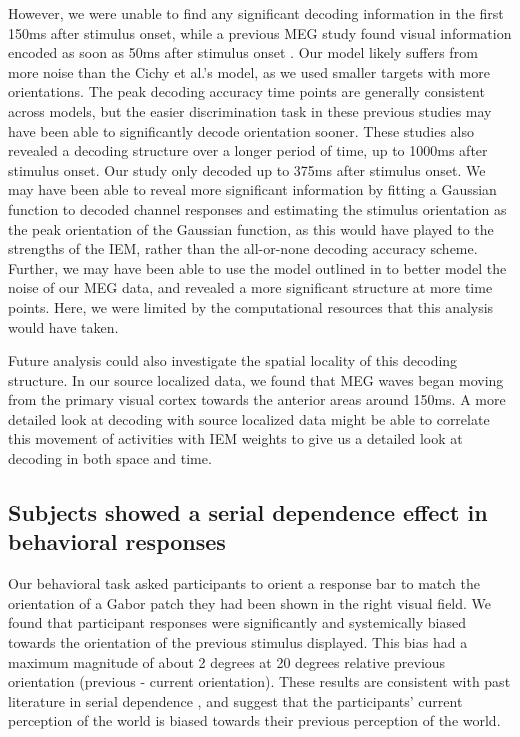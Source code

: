 \documentclass[../main.tex]{subfiles}
\begin{document}
However, we were unable to find any significant decoding information in the first 150ms after stimulus onset, while a previous MEG study found visual information encoded as soon as 50ms after stimulus onset \citep{cichy_ramirez_pantazis_2015}. Our model likely suffers from more noise than the Cichy et al.'s model, as we used smaller targets with more orientations. The peak decoding accuracy time points are generally consistent across models, but the easier discrimination task in these previous studies may have been able to significantly decode orientation sooner. These studies also revealed a decoding structure over a longer period of time, up to 1000ms after stimulus onset. Our study only decoded up to 375ms after stimulus onset. We may have been able to reveal more significant information by fitting a Gaussian function to decoded channel responses and estimating the stimulus orientation as the peak orientation of the Gaussian function, as this would have played to the strengths of the IEM, rather than the all-or-none decoding accuracy scheme. Further, we may have been able to use the model outlined in \cite{vanBergen} to better model the noise of our MEG data, and revealed a more significant structure at more time points. Here, we were limited by the computational resources that this analysis would have taken.

Future analysis could also investigate the spatial locality of this decoding structure. In our source localized data, we found that MEG waves began moving from the primary visual cortex towards the anterior areas around 150ms. A more detailed look at decoding with source localized data might be able to correlate this movement of activities with IEM weights to give us a detailed look at decoding in both space and time.


\subsection{Subjects showed a serial dependence effect in behavioral responses}
Our behavioral task asked participants to orient a response bar to match the orientation of a Gabor patch they had been shown in the right visual field. We found that participant responses were significantly and systemically biased towards the orientation of the previous stimulus displayed. This bias had a maximum magnitude of about 2 degrees at 20 degrees relative previous orientation (previous - current orientation). These results are consistent with past literature in serial dependence \citep{fischer_whitney_2014, Cicchini7867, liberman_2014, Manassi, KIYONAGA2017493}, and suggest that the participants' current perception of the world is biased towards their previous perception of the world.
\end{document}
